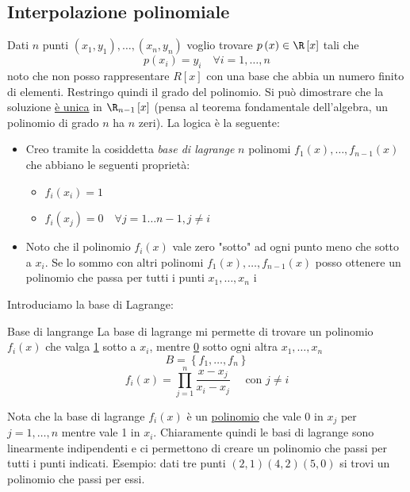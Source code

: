 \subsection{Interpolazione polinomiale}
Dati $ n $ punti $\left( x_1, y_1 \right) , \ldots, \left( x_n, y_n \right) $ voglio trovare $p\left( x \right) \in  \R\left[ x \right] $ tali che
\[
	p\left( x_i \right) = y_i \quad \forall i = 1,\ldots, n
\]
noto che non posso rappresentare $R\left[ x \right] $ con una base che abbia un numero finito di elementi. Restringo quindi il grado del polinomio. Si può dimostrare che la soluzione \underline{è unica} in $\R_{n-1}\left[ x \right] $ (pensa al teorema fondamentale dell'algebra, un polinomio di grado $n$ ha $n$ zeri).
\vskip3mm
La logica è la seguente:
\begin{itemize}
	\item Creo tramite la cosiddetta \textit{base di lagrange} $n$ polinomi $f_1\left( x \right),\ldots, f_{n - 1}\left( x \right) $ che abbiano le seguenti proprietà:
	      \begin{itemize}
		      \item $f_i\left( x_i \right) =1$
		      \item $f_i\left( x_j\right) = 0 \quad \forall j = 1\ldots n-1, j \neq i$
	      \end{itemize}
	\item Noto che il polinomio $f_i\left( x \right) $ vale zero "sotto" ad ogni punto meno che sotto a $x_i$. Se lo sommo con altri polinomi $f_1\left( x \right) ,\ldots, f_{n-1}\left( x \right) $ posso ottenere un polinomio che passa per tutti i punti $x_1,\ldots, x_{n}$
	      i
\end{itemize}
Introduciamo la base di Lagrange:
\begin{definizione}{Base di langrange}
	La base di lagrange mi permette di trovare un polinomio $f_i\left( x \right) $ che valga \underline{1} sotto a $x_i$, mentre \underline{0} sotto ogni altra $x_1,\ldots,x_n$
	\[
		B = \left\{ f_1,\ldots,f_n \right\}
	\]
	\[
		f_i\left( x \right) = \prod_{j=1}^{n} \frac{x-x_j}{x_i - x_j} \quad  \text{ con } j \neq i
	\]
\end{definizione}
Nota che la base di lagrange $f_i\left( x \right) $ è un \underline{polinomio} che vale 0 in $x_j$ per $j=1,\ldots,n$ mentre vale 1 in $x_i$. Chiaramente quindi le basi di lagrange sono linearmente indipendenti e ci permettono di creare un polinomio che passi per tutti i punti indicati.
\vskip3mm
Esempio: dati tre punti $\left( 2,1 \right)  \left( 4,2 \right)  \left( 5,0 \right) $ si trovi un polinomio che passi per essi.
